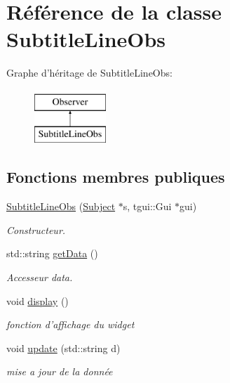 \hypertarget{classSubtitleLineObs}{\section{Référence de la classe Subtitle\+Line\+Obs}
\label{classSubtitleLineObs}
}
Graphe d'héritage de Subtitle\+Line\+Obs\+:\begin{figure}[H]
\begin{center}
\leavevmode
\includegraphics[height=2.000000cm]{classSubtitleLineObs}
\end{center}
\end{figure}
\subsection*{Fonctions membres publiques}
\begin{DoxyCompactItemize}
\item 
\hyperlink{classSubtitleLineObs_a3bfe134db1948a08b869f6671070ed1d}{Subtitle\+Line\+Obs} (\hyperlink{classSubject}{Subject} $\ast$s, tgui\+::\+Gui $\ast$gui)
\begin{DoxyCompactList}\small\item\em Constructeur. \end{DoxyCompactList}\item 
std\+::string \hyperlink{classSubtitleLineObs_a74983bcd67169fa7cabd03f156affa04}{get\+Data} ()
\begin{DoxyCompactList}\small\item\em Accesseur data. \end{DoxyCompactList}\item 
\hypertarget{classSubtitleLineObs_a57cab0db5ead28c8692f3793f5f50270}{void \hyperlink{classSubtitleLineObs_a57cab0db5ead28c8692f3793f5f50270}{display} ()}\label{classSubtitleLineObs_a57cab0db5ead28c8692f3793f5f50270}

\begin{DoxyCompactList}\small\item\em fonction d'affichage du widget \end{DoxyCompactList}\item 
void \hyperlink{classSubtitleLineObs_a5aab5a727bb01f5d8adc5d31a7521b13}{update} (std\+::string d)
\begin{DoxyCompactList}\small\item\em mise a jour de la donnée \end{DoxyCompactList}\end{DoxyCompactItemize}


